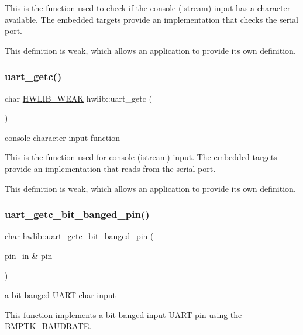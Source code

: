 This is the function used to check if the console (istream) input has a character available. The embedded targets provide an implementation that checks the serial port.

This definition is weak, which allows an application to provide its own definition. \mbox{\label{namespacehwlib_aa5ee60a7ff11cc49aba41f8be7f08a67}} 
\subsubsection{\texorpdfstring{uart\+\_\+getc()}{uart\_getc()}}
{\footnotesize\ttfamily char \hyperlink{hwlib-defines_8hpp_a04be4340016df60d6636c1d1c6d94fc9}{H\+W\+L\+I\+B\+\_\+\+W\+E\+AK} hwlib\+::uart\+\_\+getc (\begin{DoxyParamCaption}{ }\end{DoxyParamCaption})}

console character input function

This is the function used for console (istream) input. The embedded targets provide an implementation that reads from the serial port.

This definition is weak, which allows an application to provide its own definition. \mbox{\label{namespacehwlib_a9e4a38353bdbb18425459cddb55b185e}} 
\subsubsection{\texorpdfstring{uart\+\_\+getc\+\_\+bit\+\_\+banged\+\_\+pin()}{uart\_getc\_bit\_banged\_pin()}}
{\footnotesize\ttfamily char hwlib\+::uart\+\_\+getc\+\_\+bit\+\_\+banged\+\_\+pin (\begin{DoxyParamCaption}\item[{\hyperlink{classhwlib_1_1pin__in}{pin\+\_\+in} \&}]{pin }\end{DoxyParamCaption})}

a bit-\/banged U\+A\+RT char input

This function implements a bit-\/banged input U\+A\+RT pin using the B\+M\+P\+T\+K\+\_\+\+B\+A\+U\+D\+R\+A\+TE. \mbox{\label{namespacehwlib_ae568ebef4b8d8a77cecae8cea595896f}} 

